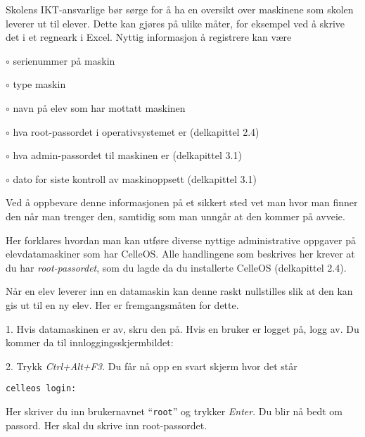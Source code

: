 Skolens IKT-ansvarlige b\o r s\o rge for \aa{} ha en oversikt over maskinene som skolen leverer ut til elever. Dette kan gj\o res p\aa{} ulike m\aa ter, for eksempel ved \aa{} skrive det i et regneark i Excel. Nyttig informasjon \aa{} registrere kan v\ae re

\smallskip
\item{$\circ$} serienummer p\aa{} maskin
\item{$\circ$} type maskin
\item{$\circ$} navn p\aa{} elev som har mottatt maskinen
\item{$\circ$} hva root-passordet i operativsystemet er (delkapittel 2.4)
\item{$\circ$} hva admin-passordet til maskinen er (delkapittel 3.1)
\item{$\circ$} dato for siste kontroll av maskinoppsett (delkapittel 3.1)

\smallskip
Ved \aa{} oppbevare denne informasjonen p\aa{} et sikkert sted vet man hvor man finner den n\aa r man trenger den, samtidig som man unng\aa r at den kommer p\aa{} avveie.

\vfill\eject

\topglue 1pc


Her forklares hvordan man kan utf\o re diverse nyttige administrative oppgaver p\aa{} elevdatamaskiner som har CelleOS. Alle handlingene som beskrives her krever at du har {\it root-passordet}, som du lagde da du installerte CelleOS (delkapittel 2.4).


N\aa r en elev leverer inn en datamaskin kan denne raskt nullstilles slik at den kan gis ut til en ny elev. Her er fremgangsm\aa ten for dette.
\item{1.} Hvis datamaskinen er av, skru den p\aa . Hvis en bruker er logget p\aa , logg av. Du kommer da til inn\-loggings\-skjerm\-bildet:

\medskip

\smallskip
\item{2.} Trykk {\it Ctrl+Alt+F3.} Du f\aa r n\aa{} opp en svart skjerm hvor det st\aa r

\medskip
{\tt celleos login:}
\medskip

\item{} Her skriver du inn brukernavnet ``{\tt root}'' og trykker {\it Enter}. Du blir n\aa{} bedt om passord. Her skal du skrive inn root-passordet.

